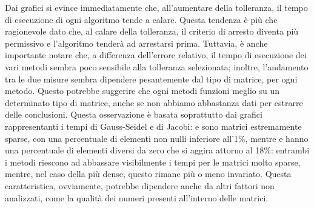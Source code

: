 Dai grafici si evince immediatamente che, all'aumentare della tolleranza, il tempo di esecuzione di ogni algoritmo tende a calare. Questa tendenza è più che ragionevole dato che, al calare della tolleranza, il criterio di arresto diventa più permissivo e l'algoritmo tenderà ad arrestarsi prima.
Tuttavia, è anche importante notare che, a differenza dell'errore relativo, il tempo di esecuzione dei vari metodi sembra poco sensibile alla tolleranza selezionata; inoltre, l'andamento tra le due misure sembra dipendere pesantemente dal tipo di matrice, per ogni metodo. Questo potrebbe suggerire che ogni metodi funzioni meglio su un determinato tipo di matrice, anche se non abbiamo abbastanza dati per estrarre delle conclusioni. Questa osservazione è basata soprattutto dai grafici rappresentanti i tempi di Gauss-Seidel e di Jacobi:  e  sono matrici estremamente sparse, con una percentuale di elementi non nulli inferiore all'1\%, mentre  e  hanno una percentuale di elementi diversi da zero che si aggira attorno al 18\%: entrambi i metodi riescono ad abbassare visibilmente i tempi per le matrici molto sparse, mentre, nel caso della più dense, questo rimane più o meno invariato. Questa caratteristica, ovviamente, potrebbe dipendere anche da altri fattori non analizzati, come la qualità dei numeri presenti all'interno delle matrici.






